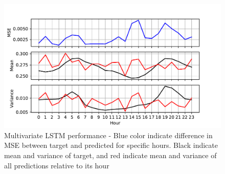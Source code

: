 \documentclass
[twocolumn,
secnumarabic,
nobibnotes,
aps,
prl,
reprint,
groupedaddress,
amsmath,
amssymb,
]{revtex4-2}
\begin{document}
\begin{figure}
  \includegraphics[width=\columnwidth]{figures/multivariate_hourly_stats_LSTM.pdf}
  \caption{\label{fig:multivariate_hourly_stats_LSTM} Multivariate LSTM performance - Blue color indicate difference in MSE between target and predicted for specific hours. Black indicate mean and variance of target, and red indicate mean and variance of all predictions relative to its hour}
\end{figure}
\end{document}
